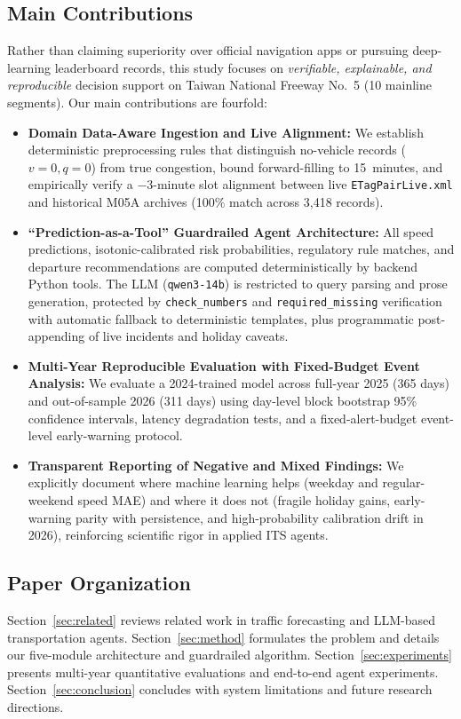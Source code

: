 \subsection{Main Contributions}
Rather than claiming superiority over official navigation apps or pursuing deep-learning leaderboard records, this study focuses on \textit{verifiable, explainable, and reproducible} decision support on Taiwan National Freeway No.~5 (10 mainline segments). Our main contributions are fourfold:
\begin{itemize}
    \item \textbf{Domain Data-Aware Ingestion and Live Alignment:} We establish deterministic preprocessing rules that distinguish no-vehicle records ($v=0, q=0$) from true congestion, bound forward-filling to 15~minutes, and empirically verify a $-3$-minute slot alignment between live \texttt{ETagPairLive.xml} and historical M05A archives (100\% match across 3,418 records).
    \item \textbf{``Prediction-as-a-Tool'' Guardrailed Agent Architecture:} All speed predictions, isotonic-calibrated risk probabilities, regulatory rule matches, and departure recommendations are computed deterministically by backend Python tools. The LLM (\texttt{qwen3-14b}) is restricted to query parsing and prose generation, protected by \texttt{check\_numbers} and \texttt{required\_missing} verification with automatic fallback to deterministic templates, plus programmatic post-appending of live incidents and holiday caveats.
    \item \textbf{Multi-Year Reproducible Evaluation with Fixed-Budget Event Analysis:} We evaluate a 2024-trained model across full-year 2025 (365 days) and out-of-sample 2026 (311 days) using day-level block bootstrap 95\% confidence intervals, latency degradation tests, and a fixed-alert-budget event-level early-warning protocol.
    \item \textbf{Transparent Reporting of Negative and Mixed Findings:} We explicitly document where machine learning helps (weekday and regular-weekend speed MAE) and where it does not (fragile holiday gains, early-warning parity with persistence, and high-probability calibration drift in 2026), reinforcing scientific rigor in applied ITS agents.
\end{itemize}

\subsection{Paper Organization}
Section~\ref{sec:related} reviews related work in traffic forecasting and LLM-based transportation agents. Section~\ref{sec:method} formulates the problem and details our five-module architecture and guardrailed algorithm. Section~\ref{sec:experiments} presents multi-year quantitative evaluations and end-to-end agent experiments. Section~\ref{sec:conclusion} concludes with system limitations and future research directions.
